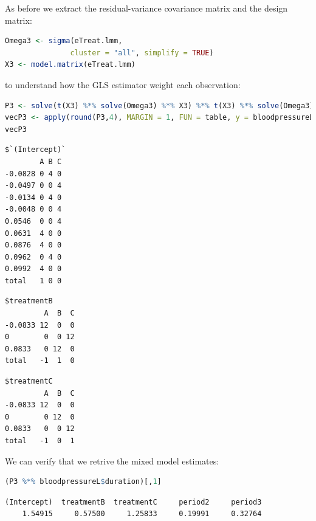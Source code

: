 \documentclass[12pt]{article}
\begin{document}
As before we extract the residual-variance covariance matrix and the
design matrix:
\begin{lstlisting}[language=r,numbers=none]
Omega3 <- sigma(eTreat.lmm,
               cluster = "all", simplify = TRUE)
X3 <- model.matrix(eTreat.lmm)
\end{lstlisting}

\noindent to understand how the GLS estimator weight each observation:

\begin{lstlisting}[language=r,numbers=none]
P3 <- solve(t(X3) %*% solve(Omega3) %*% X3) %*% t(X3) %*% solve(Omega3)
vecP3 <- apply(round(P3,4), MARGIN = 1, FUN = table, y = bloodpressureL$treatment)
vecP3
\end{lstlisting}

\begin{minipage}{0.3\linewidth}
\label{}
\begin{verbatim}
$`(Intercept)`
        A B C
-0.0828 0 4 0
-0.0497 0 0 4
-0.0134 0 4 0
-0.0048 0 0 4
0.0546  0 0 4
0.0631  4 0 0
0.0876  4 0 0
0.0962  0 4 0
0.0992  4 0 0
total   1 0 0
\end{verbatim}

\end{minipage}
\begin{minipage}{0.3\linewidth}
\label{}
\begin{verbatim}
$treatmentB
         A  B  C
-0.0833 12  0  0
0        0  0 12
0.0833   0 12  0
total   -1  1  0
\end{verbatim}

\end{minipage}
\begin{minipage}{0.3\linewidth}
\label{}
\begin{verbatim}
$treatmentC
         A  B  C
-0.0833 12  0  0
0        0 12  0
0.0833   0  0 12
total   -1  0  1
\end{verbatim}

\end{minipage}



\noindent We can verify that we retrive the mixed model estimates:
\begin{lstlisting}[language=r,numbers=none]
(P3 %*% bloodpressureL$duration)[,1]
\end{lstlisting}

\label{}
\begin{verbatim}
(Intercept)  treatmentB  treatmentC     period2     period3 
    1.54915     0.57500     1.25833     0.19991     0.32764
\end{verbatim}
\end{document}
